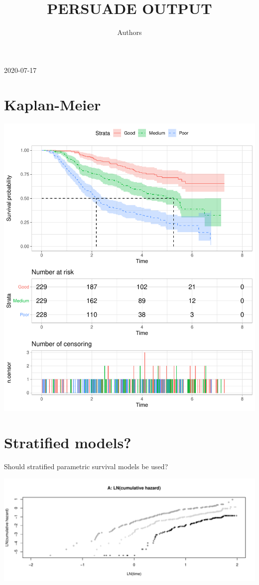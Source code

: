\documentclass[]{article}
\title{PERSUADE OUTPUT}
\author{Authors}
\date{}
\begin{document}
\maketitle

{
\setcounter{tocdepth}{2}
\tableofcontents
}
2020-07-17

\section{Kaplan-Meier}\label{kaplan-meier}

\begin{flushleft}\includegraphics{images/plot_KM-1} \end{flushleft}

\newpage

\section{Stratified models?}\label{stratified-models}

Should stratified parametric survival models be used?

\begin{flushleft}\includegraphics[height=0.29\textheight]{images/PH_assumption-1} \end{flushleft}
\end{document}
